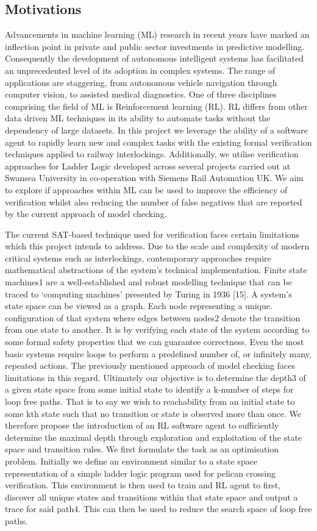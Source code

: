 \documentclass[runningheads]{llncs}
\begin{document}
\subsection{Motivations}
Advancements in machine learning (ML) research in recent years have marked an inflection
point in private and public sector investments in predictive modelling. Consequently
the development of autonomous intelligent systems has facilitated an unprecedented
level of its adoption in complex systems. The range of applications are staggering, from
autonomous vehicle navigation through computer vision, to assisted medical diagnostics.
One of three disciplines comprising the field of ML is Reinforcement learning (RL). RL
differs from other data driven ML techniques in its ability to automate tasks without the
dependency of large datasets. In this project we leverage the ability of a software agent
to rapidly learn new and complex tasks with the existing formal verification techniques
applied to railway interlockings. Additionally, we utilise verification approaches for
Ladder Logic developed across several projects carried out at Swansea University in
co-operation with Siemens Rail Automation UK. We aim to explore if approaches within
ML can be used to improve the efficiency of verification whilst also reducing the number
of false negatives that are reported by the current approach of model checking.

The current SAT-based technique used for verification faces certain limitations which this
project intends to address. Due to the scale and complexity of modern critical systems
such as interlockings, contemporary approaches require mathematical abstractions of the
system’s technical implementation. Finite state machines1 are a well-established and robust
modelling technique that can be traced to ‘computing machines’ presented by Turing in
1936 [15]. A system’s state space can be viewed as a graph. Each node representing a unique. configuration of that system where edges between nodes2 denote the transition from one
state to another. It is by verifying each state of the system according to some formal safety
properties that we can guarantee correctness. Even the most basic systems require loops
to perform a predefined number of, or infinitely many, repeated actions. The previously
mentioned approach of model checking faces limitations in this regard. Ultimately our
objective is to determine the depth3 of a given state space from some initial state to identify
a k-number of steps for loop free paths. That is to say we wish to reachability from an
initial state to some kth state such that no transition or state is observed more than once.
We therefore propose the introduction of an RL software agent to sufficiently determine
the maximal depth through exploration and exploitation of the state space and transition
rules. We first formulate the task as an optimisation problem. Initially we define an
environment similar to a state space representation of a simple ladder logic program used
for pelican crossing verification. This environment is then used to train and RL agent to
first, discover all unique states and transitions within that state space and output a trace
for said path4. This can then be used to reduce the search space of loop free paths.
\end{document}
